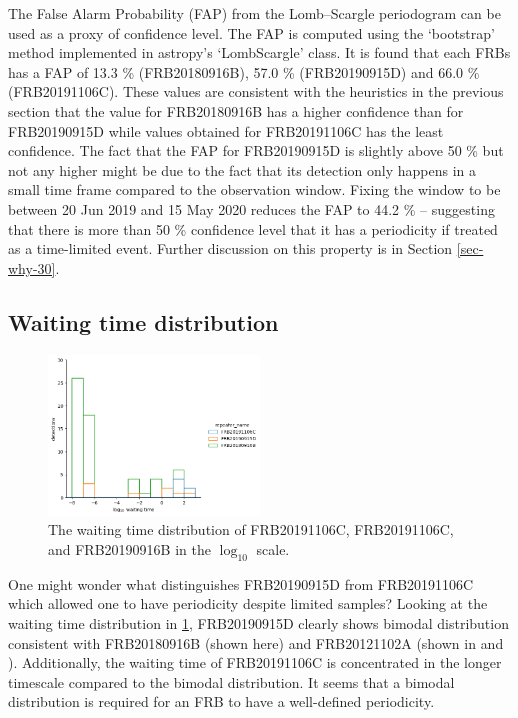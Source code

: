 \documentclass[reprint,amsmath,amssymb,showkeys,prd]{revtex4-2}
\begin{document}
The False Alarm Probability (FAP) from the Lomb--Scargle periodogram can be used as a proxy of confidence level.
The FAP is computed using the `bootstrap' method implemented in astropy's `LombScargle' class.
It is found that each FRBs has a FAP of 13.3 \% (FRB20180916B), 57.0 \% (FRB20190915D) and 66.0 \% (FRB20191106C).
These values are consistent with the heuristics in the previous section that the value for FRB20180916B has a higher confidence than for FRB20190915D while values obtained for FRB20191106C has the least confidence.
The fact that the FAP for FRB20190915D is slightly above 50 \% but not any higher might be due to the fact that its detection only happens in a small time frame compared to the observation window.
Fixing the window to be between 20 Jun 2019 and 15 May 2020 reduces the FAP to 44.2 \% -- suggesting that there is more than 50 \% confidence level that it has a periodicity if treated as a time-limited event. 
Further discussion on this property is in Section \ref{sec-why-30}.

\subsection{Waiting time distribution}

\begin{figure}[h]
    \label{fig-waitingtime}
    \caption{The waiting time distribution of FRB20191106C, FRB20191106C, and FRB20190916B in the $\log_{10}$ scale.}
    \centering
    \includegraphics[width=0.5\textwidth]{waiting.png}
\end{figure}

One might wonder what distinguishes FRB20190915D from FRB20191106C which allowed one to have periodicity despite limited samples?
Looking at the waiting time distribution in \ref{fig-waitingtime}, FRB20190915D clearly shows bimodal distribution consistent with FRB20180916B (shown here) 
and FRB20121102A (shown in \citet{hewitt_AreciboObservationsBurst_2022} and \citet{jahns_FRB20121102ANovember_2022}).
Additionally, the waiting time of FRB20191106C is concentrated in the longer timescale compared to the bimodal distribution.
It seems that a bimodal distribution is required for an FRB to have a well-defined periodicity.
\end{document}
